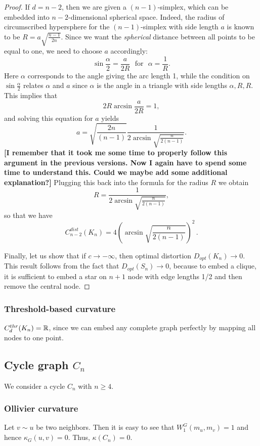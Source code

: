 \documentclass[runningheads]{llncs}
\begin{document}
\begin{proof}
If $d = n-2$, then we are given a $(n-1)$-simplex, which can be embedded into $n-2$-dimensional spherical space. Indeed, the radius of circumscribed hypersphere for the $(n-1)$-simplex with side length $a$ is known to be $R = a\sqrt{\frac{n-1}{2n}}$. Since we want the \textit{spherical} distance between all points to be equal to one, we need to choose $a$ accordingly:
\[
\sin \frac{\alpha}{2} = \frac{a}{2R} \,\,\text{ for } \,\,\alpha = \frac{1}{R}.
\]
Here $\alpha$ corresponds to the angle giving the arc length 1, while the condition on $\sin \frac{\alpha}{2}$ relates $\alpha$ and $a$ since $\alpha$ is the angle in a triangle with side lengths $\alpha, R, R$.
This implies that
\[
2 R \arcsin \frac{a}{2R} = 1,
\]
and solving this equation for $a$ yields
\[
a  = \sqrt{\frac{2n}{(n-1)}}\frac{1}{2\arcsin \sqrt{\frac{n}{2(n-1)}}}.
\]
\textbf{[I remember that it took me some time to properly follow this argument in the previous versions. Now I again have to spend some time to understand this. Could we maybe add some additional explanation?]}
Plugging this back into the formula for the radius $R$ we obtain
\[
R = \frac{1}{2\arcsin \sqrt{\frac{n}{2(n-1)}}},
\]
so that we have
\[
C_{n-2}^{dist}(K_n) = 4 \left(\arcsin \sqrt{\frac{n}{2(n-1)}}\right)^2\,.
\]

Finally, let us show that if $c \to -\infty$, then optimal distortion $D_{opt}(K_n) \to 0$. This result follows from the fact that $D_{opt}(S_n) \to 0$, because to embed a clique, it is sufficient to embed a star on $n+1$ node with edge lengths 1/2 and then remove the central node. 
\end{proof}


\subsubsection{Threshold-based curvature} 
$C_d^{thr}(K_n) = \mathbb{R}$, since we can embed any complete graph perfectly by mapping all nodes to one point. 

\subsection{Cycle graph $C_n$} 

We consider a cycle $C_n$ with $n \ge 4$.

\subsubsection{Ollivier curvature}  
Let $v \sim u$ be two neighbors. Then it is easy to see that $W_1^G(m_u,m_v) = 1$ and hence $\kappa_G(u,v) = 0$. Thus, $\kappa(C_n) = 0$.
\end{document}
